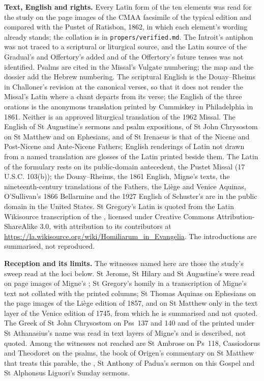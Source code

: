 {\textbf{Text, English and rights.} Every Latin form of the ten elements was read
for the study on the page images of the CMAA facsimile of the typical edition
and compared with the Pustet  of Ratisbon, 1862, in which
each element's wording already stands; the collation is in
\texttt{propers/verified.md}. The Introit's antiphon was not traced to a
scriptural or liturgical source, and the Latin source of the Gradual's and
Offertory's added  and of the Offertory's future tenses was not
identified. Psalms are cited in the Missal's Vulgate numbering; the map and the
dossier add the Hebrew numbering. The scriptural English is the Douay--Rheims in
Challoner's revision at the canonical verses, so that it does not render the
Missal's Latin where a chant departs from its verse; the English of the three
orations is the anonymous translation printed by Cummiskey in Philadelphia in
1861. Neither is an approved liturgical translation of the 1962 Missal. The
English of St Augustine's sermons and psalm expositions, of St John Chrysostom
on St Matthew and on Ephesians, and of St Irenaeus is that of the Nicene and
Post-Nicene and Ante-Nicene Fathers; English renderings of Latin not drawn from
a named translation are glosses of the Latin printed beside them. The Latin of
the formulary rests on its public-domain antecedent, the Pustet Missal (17
U.S.C. 103(b)); the Douay--Rheims, the 1861 English, Migne's texts, the
nineteenth-century translations of the Fathers, the Liège and Venice Aquinas,
O'Sullivan's 1866 Bellarmine and the 1927 English of Schuster's
 are in the public domain in the United States. St Gregory's
Latin is quoted from the Latin Wikisource transcription of the
, licensed under Creative Commons
Attribution-ShareAlike 3.0, with attribution to its contributors at
\url{https://la.wikisource.org/wiki/Homiliarum_in_Evangelia}. The  introductions are summarised, not reproduced.

\textbf{Reception and its limits.} The witnesses named here are those the
study's sweep read at the loci below. St Jerome, St Hilary and St Augustine's
 were read on page images of Migne's
; St Gregory's homily in a transcription of Migne's text
not collated with the printed columns; St Thomas Aquinas on Ephesians on the
page images of the Liège edition of 1857, and on St Matthew only in the text
layer of the Venice edition of 1745, from which he is summarised and not
quoted. The Greek of St John Chrysostom on Pss~137 and 140 and of the
 printed under St Athanasius's name was read in
text layers of Migne's  and is described, not quoted.
Among the witnesses not reached are St Ambrose on Ps~118, Cassiodorus and
Theodoret on the psalms, the book of Origen's commentary on St Matthew that
treats this parable, the , St Anthony of Padua's sermon on
this Gospel and St Alphonsus Liguori's Sunday sermons.

}
